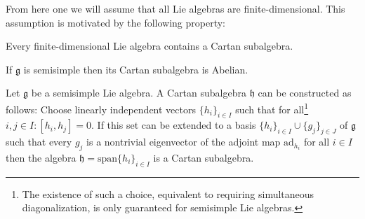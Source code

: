     From here one we will assume that all Lie algebras are finite-dimensional. This assumption is motivated by the following property:
    \begin{property}
        Every finite-dimensional Lie algebra contains a Cartan subalgebra.
    \end{property}
    \begin{property}
       If $\mathfrak{g}$ is semisimple then its Cartan subalgebra is Abelian.
    \end{property}

    \begin{construct}
        Let $\mathfrak{g}$ be a semisimple Lie algebra. A Cartan subalgebra $\mathfrak{h}$ can be constructed as follows: Choose linearly independent vectors $\{h_i\}_{i\in I}$ such that for all\footnote{The existence of such a choice, equivalent to requiring simultaneous diagonalization, is only guaranteed for semisimple Lie algebras.} $i, j\in I: [h_i, h_j] = 0$. If this set can be extended to a basis $\{h_i\}_{i\in I}\cup\{g_j\}_{j\in J}$ of $\mathfrak{g}$ such that every $g_j$ is a nontrivial eigenvector of the adjoint map $\text{ad}_{h_i}$ for all $i\in I$ then the algebra $\mathfrak{h} = \text{span}\{h_i\}_{i\in I}$ is a Cartan subalgebra.
    \end{construct}


